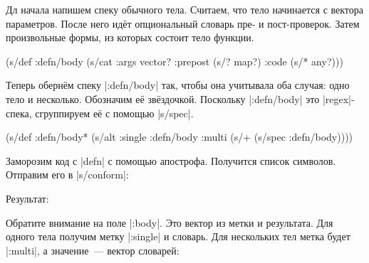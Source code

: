 Дл начала напишем спеку обычного тела. Считаем, что тело начинается с вектора
параметров. После него ид\"{е}т опциональный словарь пре- и пост-проверок. Затем
произвольные формы, из которых состоит тело функции.

\begin{english}
  \begin{clojure}
(s/def :defn/body
  (s/cat :args vector?
         :prepost (s/? map?)
         :code (s/* any?)))
  \end{clojure}
\end{english}

Теперь оберн\"{е}м спеку \spverb|:defn/body| так, чтобы она учитывала оба
случая: одно тело и несколько. Обозначим е\"{е} зв\"{е}здочкой. Поскольку
\spverb|:defn/body| это \spverb|regex|-спека, сгруппируем е\"{е} с помощью
\spverb|s/spec|.

\begin{english}
  \begin{clojure}
(s/def :defn/body*
  (s/alt :single :defn/body
         :multi (s/+ (s/spec :defn/body))))
  \end{clojure}
\end{english}


Заморозим код с \spverb|defn| с помощью апострофа. Получится список
символов. Отправим его в \spverb|s/conform|:

\begin{english}
\end{english}

\noindent
Результат:

\begin{english}
\end{english}

Обратите внимание на поле \spverb|:body|. Это вектор из метки и результата. Для
одного тела получим метку \spverb|:single| и словарь. Для нескольких тел метка
будет \spverb|:multi|, а значение~--- вектор словарей:

